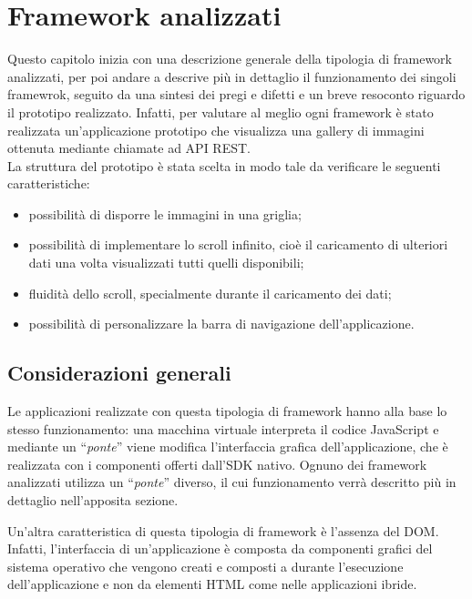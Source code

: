 
\chapter{Framework analizzati}
\label{cap:framework-analizzati}
Questo capitolo inizia con una descrizione generale della tipologia di framework analizzati, per poi andare a descrive più in dettaglio il funzionamento dei singoli framewrok, seguito da una sintesi dei pregi e difetti e un breve resoconto riguardo il prototipo realizzato.
Infatti, per valutare al meglio ogni framework è stato realizzata un'applicazione prototipo che visualizza una gallery di immagini ottenuta mediante chiamate ad \gls{API} REST.\\
La struttura del prototipo è stata scelta in modo tale da verificare le seguenti caratteristiche:
\begin{itemize}
\item possibilità di disporre le immagini in una griglia;
\item possibilità di implementare lo scroll infinito, cioè il caricamento di ulteriori dati una volta visualizzati tutti quelli disponibili;
\item fluidità dello scroll, specialmente durante il caricamento dei dati;
\item possibilità di personalizzare la barra di navigazione dell'applicazione.
\end{itemize}


\section{Considerazioni generali}
Le applicazioni realizzate con questa tipologia di framework hanno alla base lo stesso funzionamento: una macchina virtuale interpreta il codice JavaScript e mediante un ``\textit{ponte}'' viene modifica l'interfaccia grafica dell'applicazione, che è realizzata con i componenti offerti dall'SDK nativo.
Ognuno dei framework analizzati utilizza un ``\textit{ponte}'' diverso, il cui funzionamento verrà descritto più in dettaglio nell'apposita sezione.

Un'altra caratteristica di questa tipologia di framework è l'assenza del DOM.
Infatti, l'interfaccia di un'applicazione è composta da componenti grafici del sistema operativo che vengono creati e composti a durante l'esecuzione dell'applicazione e non da elementi HTML come nelle applicazioni ibride.

